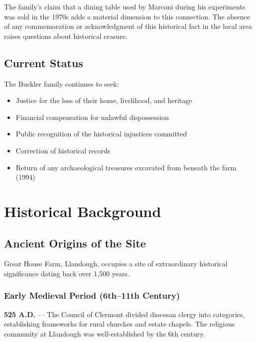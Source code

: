 \documentclass[11pt,a4paper]{article}
\begin{document}
The family's claim that a dining table used by Marconi during his experiments was sold in the 1970s adds a material dimension to this connection. The absence of any commemoration or acknowledgment of this historical fact in the local area raises questions about historical erasure.

\subsection{Current Status}

The Buckler family continues to seek:
\begin{itemize}
    \item Justice for the loss of their home, livelihood, and heritage
    \item Financial compensation for unlawful dispossession
    \item Public recognition of the historical injustices committed
    \item Correction of historical records
    \item Return of any archaeological treasures excavated from beneath the farm (1994)
\end{itemize}

\newpage

\section{Historical Background}

\subsection{Ancient Origins of the Site}

Great House Farm, Llandough, occupies a site of extraordinary historical significance dating back over 1,500 years.

\subsubsection{Early Medieval Period (6th--11th Century)}

\begin{timeline}
\textbf{525 A.D.} --- The Council of Clermont divided diocesan clergy into categories, establishing frameworks for rural churches and estate chapels. The religious community at Llandough was well-established by the 6th century.
\end{timeline}
\end{document}
